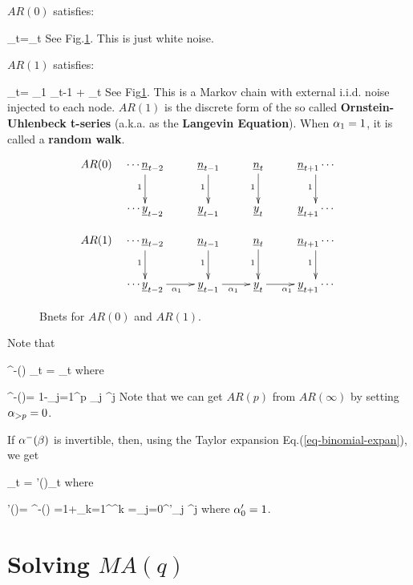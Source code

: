 $AR(0)$ satisfies:

\beq
\rvy_t=\rvn_t
\eeq
See Fig.\ref{fig-AR-0-1}.
This is just white noise.


$AR(1)$ satisfies:

\beq
\rvy_t= \alp_1 \rvy_{t-1} + \rvn_t
\eeq
See Fig\ref{fig-AR-0-1}.
This  is a Markov chain 
with external i.i.d. noise injected
to each node.
$AR(1)$
is the discrete
form of the
so called {\bf Ornstein-Uhlenbeck
 t-series} (a.k.a. as the {\bf Langevin
 Equation}).
 When $\alpha_1=1$,
it is called a {\bf random walk}.

\begin{figure}[h!]
$$
\begin{array}{cc}
AR(0)&
\xymatrix{
\cdots
\rvn_{t-2}\ar[d]_1
&\rvn_{t-1}\ar[d]_1
&\rvn_{t}\ar[d]_1
&\rvn_{t+1}\ar[d]_1
\cdots
\\
\cdots
\rvy_{t-2}
&\rvy_{t-1}
&\rvy_{t}
&\rvy_{t+1}
\cdots
}
\\
\\
AR(1)&
\xymatrix{
\cdots
\rvn_{t-2}\ar[d]_1
&\rvn_{t-1}\ar[d]_1
&\rvn_{t}\ar[d]_1
&\rvn_{t+1}\ar[d]_1
\cdots
\\
\cdots
\rvy_{t-2}\ar[r]_{\alp_1}
&\rvy_{t-1}\ar[r]_{\alp_1}
&\rvy_{t}\ar[r]_{\alp_1}
&\rvy_{t+1}
\cdots
}
\end{array}
$$
\caption{Bnets for $AR(0)$ and $AR(1)$.}
\label{fig-AR-0-1}
\end{figure}


Note that

\beq
\alp^-(\calb)
\rvy_t = \rvn_t
\label{eq-ar-alp-minus}
\;
\eeq
where

\beq
\alp^-(\calb)=
1-\sum_{j=1}^p
 \alp_j \calb^j
\eeq
Note that we can get $AR(p)$
from $AR(\infty)$
by setting $\alpha_{>p}=0$.


If $\alpha^-(\beta)$
is invertible, then, using
the Taylor expansion 
Eq.(\ref{eq-binomial-expan}), we get

\beq
\rvy_t = \alp'(\calb)\rvn_t
\eeq
where

\beq
\alp'(\calb)=
{\alp^-(\calb)}
=1+\sum_{k=1}^\infty\left[\sum_{j=1}^p\alp_j \calb^j
\right]^k
=\sum_{j=0}^\infty \alp'_j \calb^j
\eeq
where $\alpha'_0=1$.








\section{Solving $MA(q)$}

